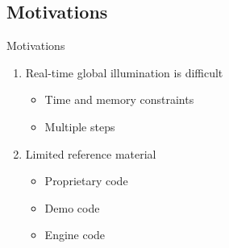 \documentclass[10pt]{beamer}
\begin{document}


\subsection{Motivations}
\begin{frame}{Motivations}
  \begin{enumerate}
    \item Real-time global illumination is difficult %
      \begin{itemize}
        \item Time and memory constraints
        \item Multiple steps
      \end{itemize}
    \item Limited reference material
      \begin{itemize}
        \item Proprietary code
        \item Demo code
        \item Engine code
      \end{itemize}
  \end{enumerate}
\end{frame}
\end{document}
